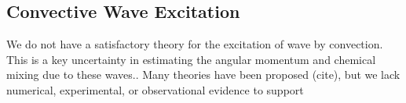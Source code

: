 {\color{purple}
\subsection{Convective Wave Excitation}
}

We do not have a satisfactory theory for the excitation of wave by convection. This is a key uncertainty in estimating the angular momentum and chemical mixing due to these waves.. Many theories have been proposed (cite), but we lack numerical, experimental, or observational evidence to support  
